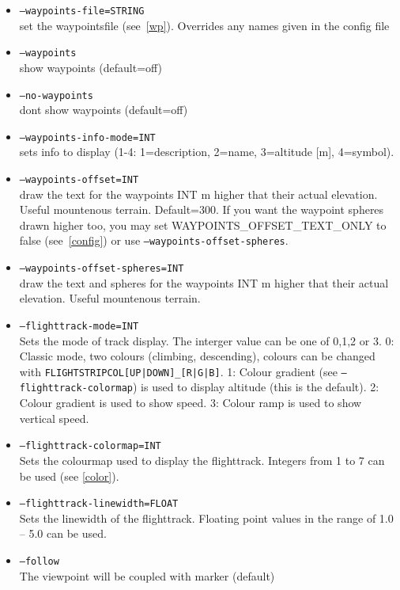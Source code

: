\begin{itemize}
\item \texttt{--waypoints-file=STRING}\\
  set the waypointsfile (see~\ref{wp}). Overrides any names given in the config file
\item \texttt{--waypoints}\\
	show waypoints  (default=off)
\item \texttt{--no-waypoints}\\
        dont show waypoints  (default=off)
\item \texttt{--waypoints-info-mode=INT}\\
	sets info to display (1-4: 1=description, 2=name, 3=altitude [m], 4=symbol).

\item \texttt{--waypoints-offset=INT}\\
        draw the text for the waypoints INT m higher that their actual elevation. Useful mountenous terrain. Default=300. If you want the waypoint spheres drawn higher too, you may set WAYPOINTS\_OFFSET\_TEXT\_ONLY to false (see~\ref{config}) or use \texttt{--waypoints-offset-spheres}.

\item \texttt{--waypoints-offset-spheres=INT}\\
        draw the text and spheres for the waypoints INT m higher that their actual elevation. Useful mountenous terrain. 

\item \texttt{--flighttrack-mode=INT}\\
Sets the mode of track display. The interger value can be one of 0,1,2 or 3. 0: Classic mode, two colours (climbing, descending), colours can
be changed with \texttt{FLIGHTSTRIPCOL[UP|DOWN]\_[R|G|B]}. 1: Colour gradient (see \texttt{--flighttrack-colormap}) is used to display altitude
(this is the default).
2: Colour gradient is used to show speed. 3: Colour ramp is used to show vertical speed.

\item \texttt{--flighttrack-colormap=INT}\\
Sets the colourmap used to display the flighttrack. Integers from 1 to 7 can be used (see \ref{color}).

\item \texttt{--flighttrack-linewidth=FLOAT}\\
Sets the linewidth of the flighttrack. Floating point values in the range of 1.0 -- 5.0 can be used.

\item \texttt{--follow} \\
The viewpoint will be coupled with marker (default)


\end{itemize}

